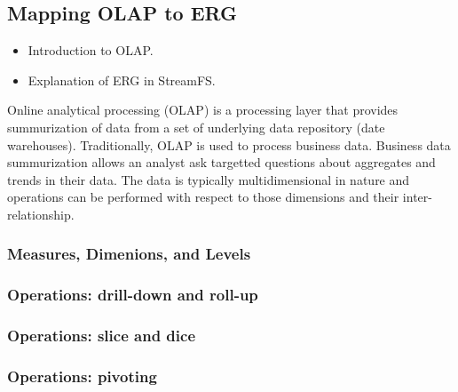 \subsection{Mapping OLAP to ERG}

\begin{itemize}
\item Introduction to OLAP.
\item Explanation of ERG in StreamFS.
\end{itemize}
Online analytical processing (OLAP) is a processing layer that provides summurization of data
from a set of underlying data repository (date warehouses).  Traditionally, OLAP is used to process
business data.  Business data summurization allows an analyst ask targetted questions about aggregates 
and trends in their data.  The data is typically multidimensional in nature and operations can be performed with
respect to those dimensions and their inter-relationship.

\subsubsection{Measures, Dimenions, and Levels}

\subsubsection{Operations: drill-down and roll-up}

\subsubsection{Operations: slice and dice}

\subsubsection{Operations: pivoting}